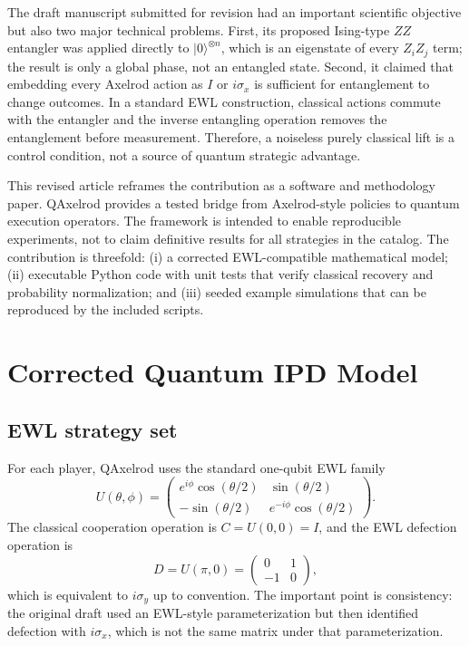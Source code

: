 \documentclass[11pt]{article}
\begin{document}
The draft manuscript submitted for revision had an important scientific objective but also two major technical problems. First, its proposed Ising-type $ZZ$ entangler was applied directly to $|0\rangle^{\otimes n}$, which is an eigenstate of every $Z_iZ_j$ term; the result is only a global phase, not an entangled state. Second, it claimed that embedding every Axelrod action as $I$ or $i\sigma_x$ is sufficient for entanglement to change outcomes. In a standard EWL construction, classical actions commute with the entangler and the inverse entangling operation removes the entanglement before measurement. Therefore, a noiseless purely classical lift is a control condition, not a source of quantum strategic advantage.

This revised article reframes the contribution as a software and methodology paper. QAxelrod provides a tested bridge from Axelrod-style policies to quantum execution operators. The framework is intended to enable reproducible experiments, not to claim definitive results for all strategies in the catalog. The contribution is threefold: (i) a corrected EWL-compatible mathematical model; (ii) executable Python code with unit tests that verify classical recovery and probability normalization; and (iii) seeded example simulations that can be reproduced by the included scripts.

\section{Corrected Quantum IPD Model}
\subsection{EWL strategy set}
For each player, QAxelrod uses the standard one-qubit EWL family
\begin{equation}
U(\theta,\phi)=
\begin{pmatrix}
e^{i\phi}\cos(\theta/2) & \sin(\theta/2)\\
-\sin(\theta/2) & e^{-i\phi}\cos(\theta/2)
\end{pmatrix}.
\end{equation}
The classical cooperation operation is $C=U(0,0)=I$, and the EWL defection operation is
\begin{equation}
D=U(\pi,0)=
\begin{pmatrix}
0&1\\-1&0
\end{pmatrix},
\end{equation}
which is equivalent to $i\sigma_y$ up to convention. The important point is consistency: the original draft used an EWL-style parameterization but then identified defection with $i\sigma_x$, which is not the same matrix under that parameterization.
\end{document}

